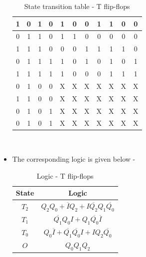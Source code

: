 \documentclass[a4paper,12pt]{article}
\begin{document}
\begin{itemize}
\begin{table}[ht]
\begin{tabular}{|c||c|c|c||c|c|c||c|c|c||c|}
        \hline
        1 & 0 & 1 & 0 & 1 & 0 & 0 & 1 & 1 & 0 & 0 \\
        \hline
        0 & 1 & 1 & 0 & 1 & 1 & 0 & 0 & 0 & 0 & 0 \\
        \hline
        1 & 1 & 1 & 0 & 0 & 0 & 1 & 1 & 1 & 1 & 0 \\
        \hline
        0 & 1 & 1 & 1 & 1 & 0 & 1 & 0 & 1 & 0 & 1 \\
        \hline
        1 & 1 & 1 & 1 & 1 & 0 & 0 & 0 & 1 & 1 & 1 \\
        \hline
        0 & 1 & 0 & 0 & X & X & X & X & X & X & X \\
        \hline
        1 & 1 & 0 & 0 & X & X & X & X & X & X & X \\
        \hline
        0 & 1 & 0 & 1 & X & X & X & X & X & X & X \\
        \hline
        0 & 1 & 0 & 1 & X & X & X & X & X & X & X \\
        \hline
        
    \end{tabular}
    \caption{State transition table - T flip-flops}
    \label{tab:state_transiton_table_t}
\end{table} \\
\item The corresponding logic is given below - \\
\begin{table}[ht]
    \centering
    \begin{tabular}{|c|c|}
        \hline
        \textbf{State} & \textbf{Logic} \\
        \hline
        $T_2$ & $Q_2 Q_0 + \overline{I} Q_2 + I \overline{Q_2} Q_1 \overline{Q_0}$ \\
        \hline
        $T_1$ & $\overline{Q_1} Q_0 I + Q_1 \overline{Q_0} \overline{I}$ \\
        \hline
        $T_0$ & $Q_0 \overline{I} + \overline{Q_1} \overline{Q_0} I + I Q_2 \overline{Q_0}$ \\
        \hline
        $O$ & $Q_0 Q_1 Q_2$ \\
        \hline
    \end{tabular}
    \caption{Logic - T flip-flops}
    \label{tab:t_logic}
\end{table}


\end{itemize}
\end{document}
